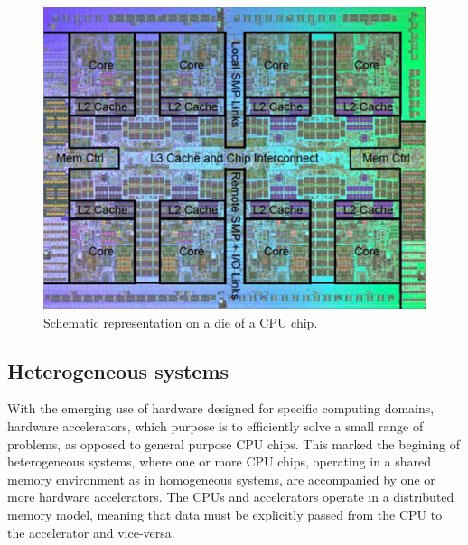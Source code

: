 \begin{figure}[!htp]
	\begin{center}
		\includegraphics[scale=4]{../../common/img/cpu_scheme.jpg}
		\caption{Schematic representation on a die of a CPU chip.}
		\label{fig:CPUChip}
	\end{center}
\end{figure}

\subsection{Heterogeneous systems}
\label{HeterogeneousSystems}

With the emerging use of hardware designed for specific computing domains, hardware accelerators, which purpose is to efficiently solve a small range of problems, as opposed to general purpose CPU chips. This marked the begining of heterogeneous systems, where one or more CPU chips, operating in a shared memory environment as in homogeneous systems, are accompanied by one or more hardware accelerators. The CPUs and accelerators operate in a distributed memory model, meaning that data must be explicitly passed from the CPU to the accelerator and vice-versa.

